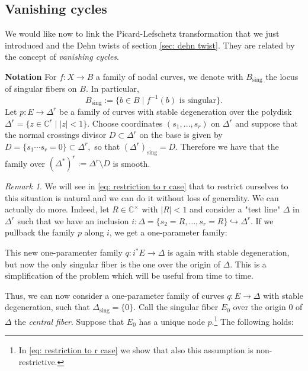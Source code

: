 \documentclass[a4paper,12 pt,titlepage,twoside]{book}
\newcommand{\numberset}{\mathbb}
\newcommand{\C}{\numberset{C}}
\DeclareMathOperator{\sing}{sing}
\theoremstyle{plain}
\theoremstyle{theorem}
\theoremstyle{definition}
\theoremstyle{remark}
\newtheorem{oss}[thm]{Remark}
\begin{document}
\subsection{Vanishing cycles}\label{sec: vanishing cycles}
We would like now to link the Picard-Lefschetz transformation that we just introduced and the Dehn twists of section \ref{sec: dehn twist}. They are related by the concept of \emph{vanishing cycles}.

\noindent\textbf{Notation} For $f \colon X \rightarrow B$ a family of nodal curves, we denote with $B_\text{sing}$ the locus of singular fibers on $B$. In particular, $$B_{\sing} := \{b \in B \mid f^{-1}(b) \text{ is singular}\}.$$
Let $p \colon E \rightarrow \Delta^r$ be a family of curves with stable degeneration over the polydisk $\Delta^r = \{z \in \C^r \mid |z| < 1\}$. Choose coordinates $(s_1, \dots,s_r)$ on $\Delta^r$ and suppose that the normal crossings divisor $D \subset \Delta^r$ on the base is given by $D = \{s_1 \cdots s_r =0\} \subset \Delta^r,$ so that $(\Delta^r)_{\text{sing}} = D.$ Therefore we have that the family over $(\Delta^*)^r := \Delta^r \setminus D$ is smooth. 
\begin{oss}\label{rmk: reduction to one parameter}
	We will see in \eqref{eq: restriction to r case} that to restrict ourselves to this situation is natural and we can do it without loss of generality. We can actually do more. Indeed, let $R \in \C^\times$ with $|R| <1$ and consider a "test line" $\Delta$ in $\Delta^r$ such that we have an inclusion $i \colon \Delta =\{s_2 =R, \dots, s_r=R\} \hookrightarrow \Delta^r.$ If we pullback the family $p$ along $i$, we get a one-parameter family:\begin{center}
	\end{center}
	This new one-paramenter family $q \colon i^*E \rightarrow \Delta$ is again with stable degeneration, but now the only singular fiber is the one over the origin of $\Delta$. This is a simplification of the problem which will be useful from time to time.
\end{oss}
Thus, we can now consider a one-parameter family of curves $q \colon E \rightarrow \Delta$ with stable degeneration, such that $\Delta_{\text{sing}}= \{0\}.$ Call the singular fiber $E_0$ over the origin $0$ of $\Delta$ the \emph{central fiber}. Suppose that $E_0$ has a unique node $p$.\footnote{In \eqref{eq: restriction to r case} we show that also this assumption is non-restrictive.} The following holds:
\end{document}
